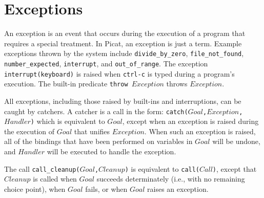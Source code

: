 \section{Exceptions}
An exception is an event that occurs during the execution of a program that requires a special treatment. In Picat, an exception is just a term. Example exceptions thrown by the system include \texttt{divide\_by\_zero}, \texttt{file\_not\_found}, \texttt{number\_expected}, \texttt{interrupt}, and \texttt{out\_of\_range}. The exception \texttt{interrupt(keyboard)} is raised when \texttt{ctrl-c} is typed during a program's execution. The built-in predicate \texttt{throw $Exception$} throws $Exception$. 

All exceptions, including those raised by built-ins and interruptions, can be caught by catchers. A catcher is a call in the form: {\tt catch($Goal$,$Exception$,$Handler$)} which is equivalent to $Goal$, except when an exception is raised during the execution of $Goal$ that unifies $Exception$. When such an exception is raised, all of the bindings that have been performed on variables in $Goal$ will be undone, and $Handler$ will be executed to handle the exception. 

The call \texttt{call\_cleanup($Goal$,$Cleanup$)} is equivalent to {\tt call($Call$)}, except that \texttt{$Cleanup$} is called when \texttt{$Goal$} succeeds determinately (i.e., with no remaining choice point), when \texttt{$Goal$} fails, or when \texttt{$Goal$} raises an exception.


